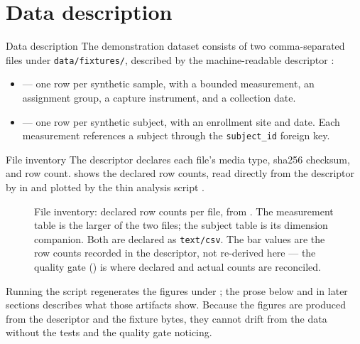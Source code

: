 \documentclass[
  ignorenonframetext,
]{beamer}
\author{\texorpdfstring{}{}}
\date{}
\makeatletter
\newcommand*\pandocbounded[1]{%
  \sbox\pandoc@box{#1}%
  \Gscale@div\@tempa{\textheight}{\dimexpr\ht\pandoc@box+\dp\pandoc@box\relax}%
  \Gscale@div\@tempb{\linewidth}{\wd\pandoc@box}%
  \ifdim\@tempb\p@<\@tempa\p@\let\@tempa\@tempb\fi%
  \ifdim\@tempa\p@<\p@\scalebox{\@tempa}{\usebox\pandoc@box}%
  \else\usebox{\pandoc@box}%
  \fi%
}
\providecommand{\tightlist}{%
  \setlength{\itemsep}{0pt}\setlength{\parskip}{0pt}}
\makeatother
\begin{document}
\section{Data description}\label{sec:data}

\begin{frame}{Data description}
The demonstration dataset consists of two comma-separated files under
\texttt{data/fixtures/}, described by the machine-readable descriptor
:

\begin{itemize}
\tightlist
\item
   --- one row per synthetic sample,
  with a bounded measurement, an assignment group, a capture instrument,
  and a collection date.
\item
   --- one row per synthetic subject, with
  an enrollment site and date. Each measurement references a subject
  through the \texttt{subject\_id} foreign key.
\end{itemize}
\end{frame}

\begin{frame}{File inventory}
\protect{}\label{file-inventory}
The descriptor declares each file's media type, sha256 checksum, and row
count.  shows the declared row counts, read
directly from the descriptor by  in
 and plotted by the thin
analysis script
\href{../scripts/generate_figures.py}{}.

\begin{figure}
\centering
\pandocbounded{\includegraphics[keepaspectratio,alt={File inventory: declared row counts per file, from file\_inventory\_rows(). The measurement table is the larger of the two files; the subject table is its dimension companion. Both are declared as text/csv. The bar values are the row counts recorded in the descriptor, not re-derived here --- the quality gate (\breakseq{[@sec:quality]}) is where declared and actual counts are reconciled.}]{../figures/file_inventory.png}}
\caption{File inventory: declared row counts per file, from
\protect{}. The measurement table is the
larger of the two files; the subject table is its dimension companion.
Both are declared as \protect\texttt{text/csv}. The bar values are the
row counts recorded in the descriptor, not re-derived here --- the
quality gate () is where declared and actual counts
are reconciled.}\label{fig:file_inventory}
\end{figure}

Running the script regenerates the figures under
; the prose below and in later sections
describes what those artifacts show. Because the figures are produced
from the descriptor and the fixture bytes, they cannot drift from the
data without the tests and the quality gate noticing.
\end{frame}
\end{document}
